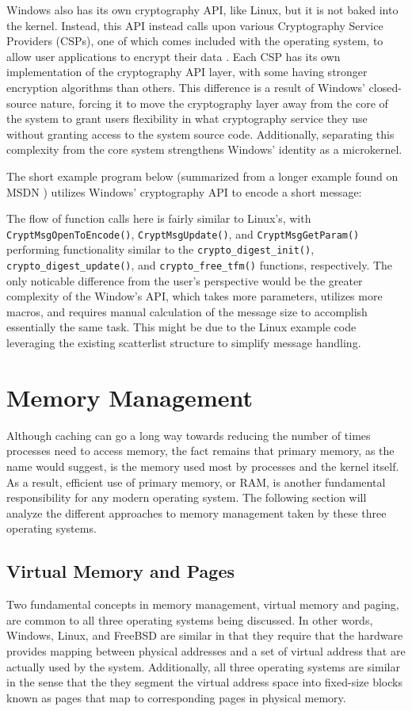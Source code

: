 \documentclass[onecolumn, draftclsnofoot,10pt, compsoc]{IEEEtran}
\begin{document}
Windows also has its own cryptography API, like Linux, but it is not baked into the kernel. Instead, this API instead calls upon various Cryptography Service Providers (CSPs), one of which comes included with the operating system, to allow user applications to encrypt their data \cite{WindowsCrypto}. Each CSP has its own implementation of the cryptography API layer, with some having stronger encryption algorithms than others. This difference is a result of Windows' closed-source nature, forcing it to move the cryptography layer away from the core of the system to grant users flexibility in what cryptography service they use without granting access to the system source code. Additionally, separating this complexity from the core system strengthens Windows' identity as a microkernel.

The short example program below (summarized from a longer example found on MSDN \cite{WinCryptExample}) utilizes Windows' cryptography API to encode a short message:

The flow of function calls here is fairly similar to Linux's, with \verb`CryptMsgOpenToEncode()`, \verb`CryptMsgUpdate()`, and \verb`CryptMsgGetParam()` performing functionality similar to the \verb`crypto_digest_init()`, \verb`crypto_digest_update()`, and \verb`crypto_free_tfm()` functions, respectively. The only noticable difference from the user's perspective would be the greater complexity of the Window's API, which takes more parameters, utilizes more macros, and requires manual calculation of the message size to accomplish essentially the same task. This might be due to the Linux example code leveraging the existing scatterlist structure to simplify message handling.
\section{Memory Management}
Although caching can go a long way towards reducing the number of times processes need to access memory, the fact remains that primary memory, as the name would suggest, is the memory used most by processes and the kernel itself. As a result, efficient use of primary memory, or RAM, is another fundamental responsibility for any modern operating system. The following section will analyze the different approaches to memory management taken by these three operating systems.
\subsection{Virtual Memory and Pages}
Two fundamental concepts in memory management, virtual memory and paging, are common to all three operating systems being discussed. In other words, Windows, Linux, and FreeBSD are similar in that they require that the hardware provides mapping between physical addresses and a set of virtual address that are actually used by the system. Additionally, all three operating systems are similar in the sense that the they segment the virtual address space into fixed-size blocks known as pages that map to corresponding pages in physical memory. 
\end{document}

